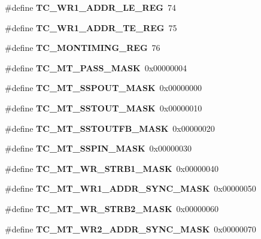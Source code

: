 \begin{DoxyCompactItemize}
\#define {\bfseries T\+C\+\_\+\+W\+R1\+\_\+\+A\+D\+D\+R\+\_\+\+L\+E\+\_\+\+R\+EG}~74
\item 
\mbox{\label{_t_a_r_g_e_t_c___register_map_8h_aceb2227d572ab34732319f88d9fd267d}} 
\#define {\bfseries T\+C\+\_\+\+W\+R1\+\_\+\+A\+D\+D\+R\+\_\+\+T\+E\+\_\+\+R\+EG}~75
\item 
\mbox{\label{_t_a_r_g_e_t_c___register_map_8h_a8fe2df15572bcd67cf27adc1cb9b2702}} 
\#define {\bfseries T\+C\+\_\+\+M\+O\+N\+T\+I\+M\+I\+N\+G\+\_\+\+R\+EG}~76
\item 
\mbox{\label{_t_a_r_g_e_t_c___register_map_8h_abba38eb7b4de931e6ca68697289b7f9d}} 
\#define {\bfseries T\+C\+\_\+\+M\+T\+\_\+\+P\+A\+S\+S\+\_\+\+M\+A\+SK}~0x00000004
\item 
\mbox{\label{_t_a_r_g_e_t_c___register_map_8h_aff546d26b72ef1f358437d0f020c523d}} 
\#define {\bfseries T\+C\+\_\+\+M\+T\+\_\+\+S\+S\+P\+O\+U\+T\+\_\+\+M\+A\+SK}~0x00000000
\item 
\mbox{\label{_t_a_r_g_e_t_c___register_map_8h_a0a27210e8358fefa6032fcdbf5134d9d}} 
\#define {\bfseries T\+C\+\_\+\+M\+T\+\_\+\+S\+S\+T\+O\+U\+T\+\_\+\+M\+A\+SK}~0x00000010
\item 
\mbox{\label{_t_a_r_g_e_t_c___register_map_8h_a0d3beb83b6d42970d44a614735d1fe5a}} 
\#define {\bfseries T\+C\+\_\+\+M\+T\+\_\+\+S\+S\+T\+O\+U\+T\+F\+B\+\_\+\+M\+A\+SK}~0x00000020
\item 
\mbox{\label{_t_a_r_g_e_t_c___register_map_8h_ac914f73f7ff8db1a134d9e2b4b65c9b9}} 
\#define {\bfseries T\+C\+\_\+\+M\+T\+\_\+\+S\+S\+P\+I\+N\+\_\+\+M\+A\+SK}~0x00000030
\item 
\mbox{\label{_t_a_r_g_e_t_c___register_map_8h_a2a1a65ddfd08eedd1613688a6484ffcd}} 
\#define {\bfseries T\+C\+\_\+\+M\+T\+\_\+\+W\+R\+\_\+\+S\+T\+R\+B1\+\_\+\+M\+A\+SK}~0x00000040
\item 
\mbox{\label{_t_a_r_g_e_t_c___register_map_8h_a1eea5d7878d4afe383a653b3fa1c6ee1}} 
\#define {\bfseries T\+C\+\_\+\+M\+T\+\_\+\+W\+R1\+\_\+\+A\+D\+D\+R\+\_\+\+S\+Y\+N\+C\+\_\+\+M\+A\+SK}~0x00000050
\item 
\mbox{\label{_t_a_r_g_e_t_c___register_map_8h_a9909d44f8978de1e25a05fb55fe76eba}} 
\#define {\bfseries T\+C\+\_\+\+M\+T\+\_\+\+W\+R\+\_\+\+S\+T\+R\+B2\+\_\+\+M\+A\+SK}~0x00000060
\item 
\mbox{\label{_t_a_r_g_e_t_c___register_map_8h_a2f385bae7b60c9a60c6912e6b6f88d8a}} 
\#define {\bfseries T\+C\+\_\+\+M\+T\+\_\+\+W\+R2\+\_\+\+A\+D\+D\+R\+\_\+\+S\+Y\+N\+C\+\_\+\+M\+A\+SK}~0x00000070
\item 
\mbox{\label{_t_a_r_g_e_t_c___register_map_8h_a137dfc2423fb0ce02c433b5e927e8b92}} 

\end{DoxyCompactItemize}
